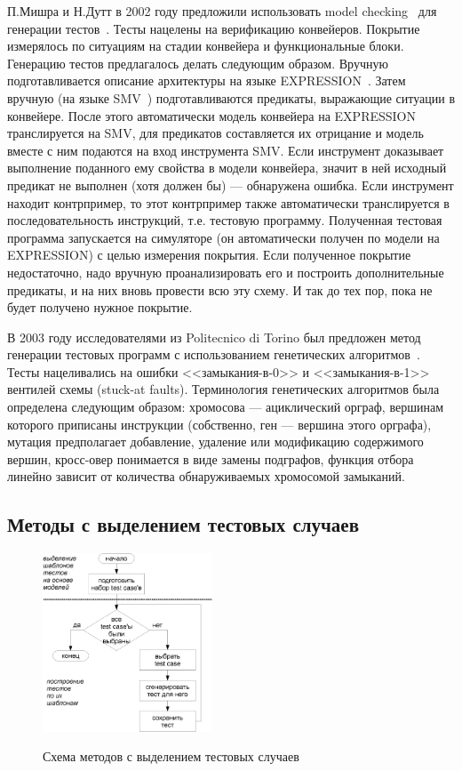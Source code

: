 \documentclass[14pt]{extreport}
\begin{document}
П.Мишра и Н.Дутт в 2002 году предложили использовать model checking~\cite{ModelChecking} для генерации тестов~\cite{MishraDutt02}. Тесты нацелены на верификацию конвейеров. Покрытие измерялось по ситуациям на стадии конвейера и функциональные блоки. Генерацию тестов предлагалось делать следующим образом. Вручную подготавливается описание архитектуры на языке EXPRESSION~\cite{EXPRESSION}. Затем вручную (на языке SMV~\cite{SMV}) подготавливаются предикаты, выражающие ситуации в конвейере. После этого автоматически модель конвейера на EXPRESSION транслируется на SMV, для предикатов составляется их отрицание и модель вместе с ним подаются на вход инструмента SMV. Если инструмент доказывает выполнение поданного ему свойства в модели конвейера, значит в ней исходный предикат не выполнен (хотя должен бы) --- обнаружена ошибка. Если инструмент находит контрпример, то этот контрпример также автоматически транслируется в последовательность инструкций, т.е. тестовую программу. Полученная тестовая программа запускается на симуляторе (он автоматически получен по модели на EXPRESSION) с целью измерения покрытия. Если полученное покрытие недостаточно, надо вручную проанализировать его и построить дополнительные предикаты, и на них вновь провести всю эту схему. И так до тех пор, пока не будет получено нужное покрытие.

В 2003 году исследователями из Politecnico di Torino был предложен метод генерации тестовых программ с использованием генетических алгоритмов~\cite{microGP}. Тесты нацеливались на ошибки <<замыкания-в-0>> и <<замыкания-в-1>> вентилей схемы (stuck-at faults). Терминология генетических алгоритмов была определена следующим образом: хромосова --- ациклический орграф, вершинам которого приписаны инструкции (собственно, ген --- вершина этого орграфа), мутация предполагает добавление, удаление или модификацию содержимого вершин, кросс-овер понимается в виде замены подграфов, функция отбора линейно зависит от количества обнаруживаемых хромосомой замыканий.

\subsection{Методы с выделением тестовых случаев}

\begin{figure}[h] \center
  \includegraphics[width=0.45\textwidth]{1.review/methods2}\\
  \caption{Схема методов с выделением тестовых случаев}\label{fig:methods2}
\end{figure}
\end{document}
